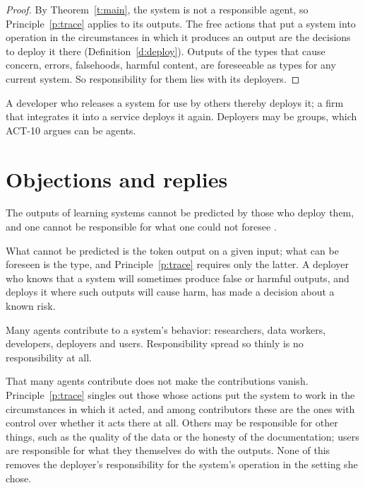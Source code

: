 \documentclass{situationist-preprint}
\begin{document}
\begin{proof}
By Theorem~\ref{t:main}, the system is not a responsible agent, so Principle~\ref{p:trace} applies to its outputs. The free actions that put a system into operation in the circumstances in which it produces an output are the decisions to deploy it there (Definition~\ref{d:deploy}). Outputs of the types that cause concern, errors, falsehoods, harmful content, are foreseeable as types for any current system. So responsibility for them lies with its deployers.
\end{proof}

A developer who releases a system for use by others thereby deploys it; a firm that integrates it into a service deploys it again. Deployers may be groups, which ACT-10 argues can be agents.

\section{Objections and replies}

\begin{objection}[Unpredictability]
The outputs of learning systems cannot be predicted by those who deploy them, and one cannot be responsible for what one could not foresee \citep{Matthias2004}.
\end{objection}

\begin{reply}
What cannot be predicted is the token output on a given input; what can be foreseen is the type, and Principle~\ref{p:trace} requires only the latter. A deployer who knows that a system will sometimes produce false or harmful outputs, and deploys it where such outputs will cause harm, has made a decision about a known risk.
\end{reply}

\begin{objection}
Many agents contribute to a system's behavior: researchers, data workers, developers, deployers and users. Responsibility spread so thinly is no responsibility at all.
\end{objection}

\begin{reply}
That many agents contribute does not make the contributions vanish. Principle~\ref{p:trace} singles out those whose actions put the system to work in the circumstances in which it acted, and among contributors these are the ones with control over whether it acts there at all. Others may be responsible for other things, such as the quality of the data or the honesty of the documentation; users are responsible for what they themselves do with the outputs. None of this removes the deployer's responsibility for the system's operation in the setting she chose.
\end{reply}
\end{document}

